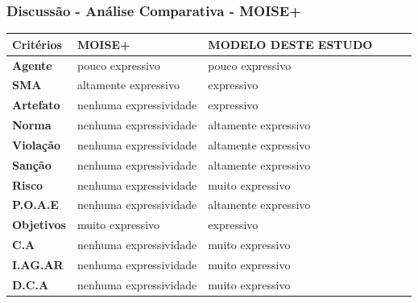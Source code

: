 \documentclass{beamer}
\begin{document}
\begin{frame}
	\frametitle{Discussão - Análise Comparativa - MOISE+}
	\begin{table}[H]
	    \begin{tabular}{|l|l|l|l|l|l|}
	        \textbf{Critérios} 	&	 \textbf{MOISE+}        	&	 \textbf{MODELO DESTE ESTUDO} \\ \hline
	        \textbf{Agente}    	&	 pouco expressivo       	&	 pouco expressivo             \\ \hline
	        \textbf{SMA}       	&	 altamente expressivo   	&	 expressivo                   \\ \hline
	        \textbf{Artefato}  	&	 nenhuma expressividade 	&	 expressivo                   \\ \hline
	        \textbf{Norma}     	&	 nenhuma expressividade 	&	 altamente expressivo         \\ \hline
	        \textbf{Violação}  	&	 nenhuma expressividade 	&	 altamente expressivo         \\ \hline
	        \textbf{Sanção}    	&	 nenhuma expressividade 	&	 altamente expressivo         \\ \hline
	        \textbf{Risco}     	&	 nenhuma expressividade 	&	 muito expressivo             \\ \hline
	        \textbf{P.O.A.E}   	&	 nenhuma expressividade 	&	 altamente expressivo         \\ \hline
	        \textbf{Objetivos} 	&	 muito expressivo       	&	 expressivo             \\ \hline
	        \textbf{C.A}       	&	 nenhuma expressividade 	&	 muito expressivo             \\ \hline
	        \textbf{I.AG.AR}   	&	 nenhuma expressividade 	&	 muito expressivo             \\ \hline
	        \textbf{D.C.A}     	&	 nenhuma expressividade 	&	 muito expressivo             \\ \hline
	    \end{tabular}
	\end{table}
\end{frame}
\end{document}

